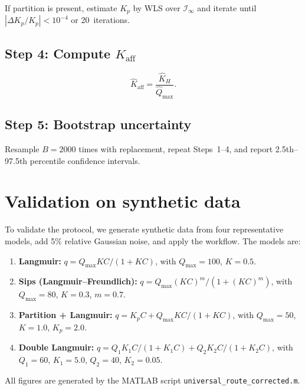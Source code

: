 \documentclass[12pt]{article}
\begin{document}
If partition is present, estimate $K_p$ by WLS over $\mathcal{I}_\infty$
and iterate until $|\Delta K_p/K_p|<10^{-4}$ or 20~iterations.

\subsection{Step 4: Compute $K_{\mathrm{aff}}$}

\begin{equation}
  \widehat{K}_{\mathrm{aff}} = \frac{\widehat{K}_H}{\widehat{Q}_{\max}}.
  \label{eq:Kaff_est}
\end{equation}

\subsection{Step 5: Bootstrap uncertainty}

Resample $B=2000$ times with replacement, repeat Steps~1--4, and report
2.5th--97.5th percentile confidence intervals.

\section{Validation on synthetic data}
\label{sec:validation}

To validate the protocol, we generate synthetic data from four
representative models, add 5\% relative Gaussian noise, and apply the
workflow.  The models are:

\begin{enumerate}[nosep]
  \item \textbf{Langmuir:}
        $q = Q_{\max} K C/(1+KC)$, with $Q_{\max}=100$, $K=0.5$.
  \item \textbf{Sips (Langmuir--Freundlich):}
        $q = Q_{\max}(KC)^m/(1+(KC)^m)$, with $Q_{\max}=80$, $K=0.3$, $m=0.7$.
  \item \textbf{Partition + Langmuir:}
        $q = K_p C + Q_{\max} K C/(1+KC)$, with $Q_{\max}=50$, $K=1.0$, $K_p=2.0$.
  \item \textbf{Double Langmuir:}
        $q = Q_1 K_1 C/(1+K_1 C) + Q_2 K_2 C/(1+K_2 C)$, with
        $Q_1=60$, $K_1=5.0$, $Q_2=40$, $K_2=0.05$.
\end{enumerate}

All figures are generated by the MATLAB script
\texttt{universal\_route\_corrected.m}.
\end{document}
